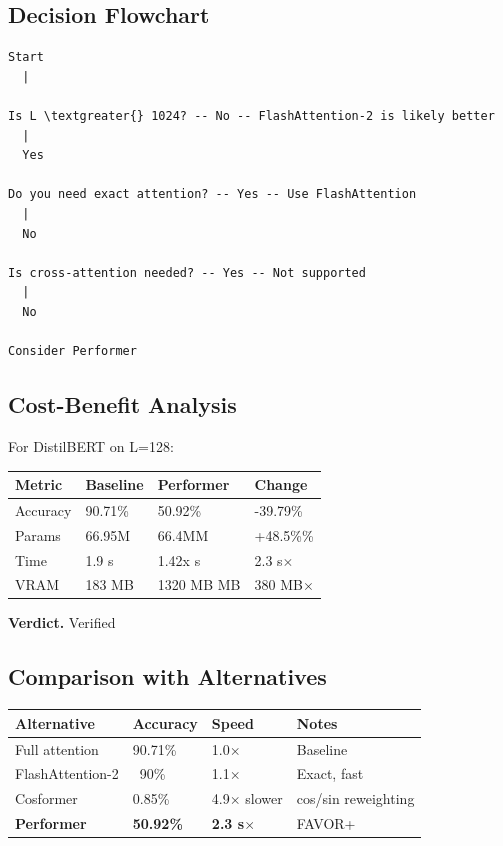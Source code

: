 \subsection{Decision Flowchart}

\begin{lstlisting}
Start
  |
   
Is L \textgreater{} 1024? -- No -- FlashAttention-2 is likely better
  |
  Yes
   
Do you need exact attention? -- Yes -- Use FlashAttention
  |
  No
   
Is cross-attention needed? -- Yes -- Not supported
  |
  No
   
Consider Performer
\end{lstlisting}

\subsection{Cost-Benefit Analysis}

For DistilBERT on L=128:

\begin{table}[H]
\centering
\small
\begin{tabular}{llll}
\toprule
\textbf{Metric} & \textbf{Baseline} & \textbf{Performer} & \textbf{Change} \\
\midrule
Accuracy & 90.71\% & 50.92\% & -39.79\% \\
Params & 66.95M & 66.4MM & +48.5\%\% \\
Time & 1.9 s & 1.42x s & 2.3 s$\times$ \\
VRAM & 183 MB & 1320 MB MB & 380 MB$\times$ \\
\bottomrule
\end{tabular}
\end{table}

\textbf{Verdict.} Verified

\subsection{Comparison with Alternatives}

\begin{table}[H]
\centering
\small
\begin{tabular}{llll}
\toprule
\textbf{Alternative} & \textbf{Accuracy} & \textbf{Speed} & \textbf{Notes} \\
\midrule
Full attention & 90.71\% & 1.0$\times$ & Baseline \\
FlashAttention-2 & ~90\% & 1.1$\times$ & Exact, fast \\
Cosformer & 0.85\% & 4.9$\times$ slower & cos/sin reweighting \\
\textbf{Performer} & \textbf{50.92\%} & \textbf{2.3 s$\times$} & FAVOR+ \\
\bottomrule
\end{tabular}
\end{table}

